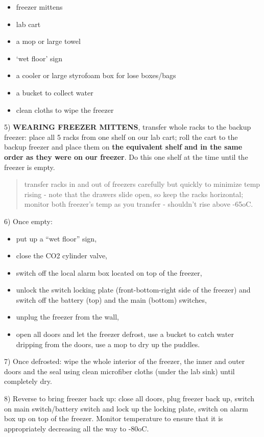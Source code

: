 \documentclass[
  letterpaper,
  DIV=11,
  numbers=noendperiod]{scrreprt}
\begin{document}
\begin{itemize}
\item
  freezer mittens
\item
  lab cart
\item
  a mop or large towel
\item
  `wet floor' sign
\item
  a cooler or large styrofoam box for lose boxes/bags
\item
  a bucket to collect water
\item
  clean cloths to wipe the freezer
\end{itemize}

5) \textbf{WEARING FREEZER MITTENS}, transfer whole racks to the backup
freezer: place all 5 racks from one shelf on our lab cart; roll the cart
to the backup freezer and place them on \textbf{the equivalent shelf and
in the same order as they were on our freezer}. Do this one shelf at the
time until the freezer is empty.

\begin{quote}
transfer racks in and out of freezers carefully but quickly to minimize
temp rising - note that the drawers slide open, so keep the racks
horizontal; monitor both freezer's temp as you transfer - shouldn't rise
above -65oC.
\end{quote}

6) Once empty:

\begin{itemize}
\item
  put up a ``wet floor'' sign,
\item
  close the CO2 cylinder valve,
\item
  switch off the local alarm box located on top of the freezer,
\item
  unlock the switch locking plate (front-bottom-right side of the
  freezer) and switch off the battery (top) and the main (bottom)
  switches,
\item
  unplug the freezer from the wall,
\item
  open all doors and let the freezer defrost, use a bucket to catch
  water dripping from the doors, use a mop to dry up the puddles.
\end{itemize}

7) Once defrosted: wipe the whole interior of the freezer, the inner and
outer doors and the seal using clean microfiber cloths (under the lab
sink) until completely dry.

8) Reverse to bring freezer back up: close all doors, plug freezer back
up, switch on main switch/battery switch and lock up the locking plate,
switch on alarm box up on top of the freezer. Monitor temperature to
ensure that it is appropriately decreasing all the way to -80oC.
\end{document}

